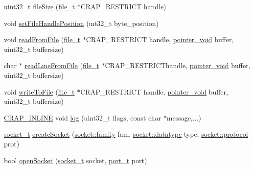 \begin{DoxyCompactItemize}
uint32\+\_\+t \hyperlink{namespacecrap_aadea1555cd17b168f91b3d03171b8179}{file\+Size} (\hyperlink{namespacecrap_afd3eedf00a9de7958b7dd70aafff79a4}{file\+\_\+t} $\ast$C\+R\+A\+P\+\_\+\+R\+E\+S\+T\+R\+I\+C\+T handle)
\item 
void \hyperlink{namespacecrap_a3a5d242b2926fdc057a72fa3387d076c}{set\+File\+Handle\+Position} (int32\+\_\+t byte\+\_\+position)
\item 
void \hyperlink{namespacecrap_a9aabeee93bb15d29856ac9fad19a012f}{read\+From\+File} (\hyperlink{namespacecrap_afd3eedf00a9de7958b7dd70aafff79a4}{file\+\_\+t} $\ast$C\+R\+A\+P\+\_\+\+R\+E\+S\+T\+R\+I\+C\+T handle, \hyperlink{namespacecrap_aa4cb82451ede6b73c49d862af29aebb3}{pointer\+\_\+void} buffer, uint32\+\_\+t buffersize)
\item 
char $\ast$ \hyperlink{namespacecrap_a88b135bd26154fde9e09c9638523203d}{read\+Line\+From\+File} (\hyperlink{namespacecrap_afd3eedf00a9de7958b7dd70aafff79a4}{file\+\_\+t} $\ast$C\+R\+A\+P\+\_\+\+R\+E\+S\+T\+R\+I\+C\+Thandle, \hyperlink{namespacecrap_aa4cb82451ede6b73c49d862af29aebb3}{pointer\+\_\+void} buffer, uint32\+\_\+t buffersize)
\item 
void \hyperlink{namespacecrap_a44ce23333dcd545198f1ca1687059a63}{write\+To\+File} (\hyperlink{namespacecrap_afd3eedf00a9de7958b7dd70aafff79a4}{file\+\_\+t} $\ast$C\+R\+A\+P\+\_\+\+R\+E\+S\+T\+R\+I\+C\+T handle, \hyperlink{namespacecrap_aa4cb82451ede6b73c49d862af29aebb3}{pointer\+\_\+void} buffer, uint32\+\_\+t buffersize)
\item 
\hyperlink{config__x86_8h_a5a40526b8d842e7ff731509998bb0f1c}{C\+R\+A\+P\+\_\+\+I\+N\+L\+I\+N\+E} void \hyperlink{namespacecrap_a8259cc46db12f668a9e94f654143415f}{log} (uint32\+\_\+t flags, const char $\ast$message,...)
\item 
\hyperlink{namespacecrap_af06d7d92e9405fc0750f74417541c2be}{socket\+\_\+t} \hyperlink{namespacecrap_a44d1fb3cd2b407f4526aa9a5f1a85477}{create\+Socket} (\hyperlink{namespacecrap_1_1socket_a88607c55f3a2a4df16826f314bda4653}{socket\+::family} fam, \hyperlink{namespacecrap_1_1socket_af7718da996e5427024d9ab56b67f12e9}{socket\+::datatype} type, \hyperlink{namespacecrap_1_1socket_ad72da11fb547a5bd0e18fadda8100193}{socket\+::protocol} prot)
\item 
bool \hyperlink{namespacecrap_aa0b64d27506e00b57319bf50d6f9db07}{open\+Socket} (\hyperlink{namespacecrap_af06d7d92e9405fc0750f74417541c2be}{socket\+\_\+t} socket, \hyperlink{namespacecrap_a21d8c14ae6ca715c519ff369042149dd}{port\+\_\+t} port)
\item 

\end{DoxyCompactItemize}
